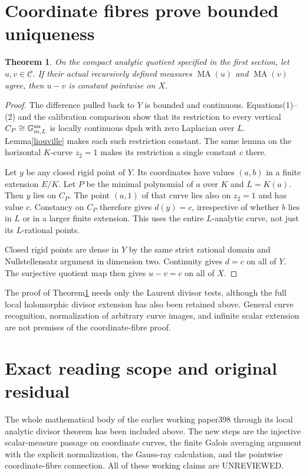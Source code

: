 \documentclass[11pt]{article}
\newtheorem{theorem}{Theorem}
\newcommand{\MA}{\operatorname{MA}}
\begin{document}
\section{Coordinate fibres prove bounded uniqueness}
\begin{theorem}\label{boundedunique}
On the compact analytic quotient specified in the first section, let
$u,v\in\mathcal C$. If their actual recursively defined measures
$\MA(u)$ and $\MA(v)$ agree, then $u-v$ is constant pointwise on $X$.
\end{theorem}
\begin{proof}
The difference pulled back to $Y$ is bounded and continuous.
Equations(1)--(2) and the calibration comparison show that its
restriction to every vertical $C_P\cong\mathbb G_{m,L}^{\rm an}$
is locally continuous dpsh with zero Laplacian over $L$.
Lemma\ref{liouville} makes each such restriction constant.
The same lemma on the horizontal $K$-curve $z_2=1$ makes its
restriction a single constant $c$ there.

Let $y$ be any closed rigid point of $Y$. Its coordinates have values
$(a,b)$ in a finite extension $E/K$. Let $P$ be the minimal polynomial
of $a$ over $K$ and $L=K(a)$. Then $y$ lies on $C_P$.
The point $(a,1)$ of that curve lies also on $z_2=1$ and has value
$c$. Constancy on $C_P$ therefore gives $d(y)=c$, irrespective of
whether $b$ lies in $L$ or in a larger finite extension. This uses
the entire $L$-analytic curve, not just its $L$-rational points.

Closed rigid points are dense in $Y$ by the same strict rational
domain and Nullstellensatz argument in dimension two.
Continuity gives $d=c$ on all of $Y$. The surjective quotient map
then gives $u-v=c$ on all of $X$.
\end{proof}
The proof of Theorem\ref{boundedunique} needs only the Laurent
divisor tests, although the full local holomorphic divisor extension
has also been retained above. General curve recognition, normalization
of arbitrary curve images, and infinite scalar extension are not
premises of the coordinate-fibre proof.

\section{Exact reading scope and original residual}
The whole mathematical body of the earlier working paper398 through
its local analytic divisor theorem has been included above. The new
steps are the injective scalar-measure passage on coordinate curves,
the finite Galois averaging argument with the explicit normalization,
the Gauss-ray calculation, and the pointwise coordinate-fibre connection.
All of these working claims are UNREVIEWED.
\end{document}
